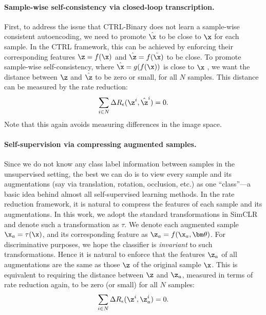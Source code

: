 \documentclass[../../book-main.tex]{subfiles}
\begin{document}
\paragraph{Sample-wise self-consistency via closed-loop transcription.} 
First, to address the issue that CTRL-Binary does not learn a sample-wise consistent autoencoding, we need to promote $\hat \x$ to be close to $\x$ for each sample. In the CTRL framework, this can be achieved by enforcing their corresponding features $\z=f(\x)$ and $\hat \z = f(\hat \x)$ to be close. 
To promote sample-wise self-consistency, where $\hat{\x} = g(f(\x))$ is close to $\x$ , we want the distance between $\z$ and $\hat{\z}$ to be zero or small, for all $N$ samples.
This distance can be measured by the rate reduction:
\begin{align}
\sum_{i\in N} \Delta R_\epsilon(\z^i,\hat{\z}^i) = 0.
\label{eqn:sample-self-consistency}\vspace{-2mm}
\end{align}
Note that this again avoids measuring differences in the image space.

\paragraph{Self-supervision via compressing augmented samples.} 
Since we do not know any class label information between samples in the unsupervised setting, the best we can do is to view every sample and its augmentations (say via translation, rotation, occlusion, etc.) as one ``class''—a basic idea behind almost all self-supervised learning methods. In the rate reduction framework, it is natural to compress the features of each sample and its augmentations. In this work, we adopt the standard transformations in SimCLR \cite{chen2020simple} and denote such a transformation as $\tau$. We denote each augmented sample $\x_a = \tau(\x)$, and its corresponding feature as $\z_a = f(\x_a, \bm \theta) $. For discriminative purposes, we hope the classifier is {\em invariant} to such transformations. Hence it is natural to enforce that the features $\z_a$ of all augmentations are the same as those $\z$ of the original sample $\x$. This is equivalent to requiring the distance between $\z$  and  $\z_a$, measured in terms of rate reduction again, to be zero (or small) for all $N$ samples: 
\begin{align}
\sum_{i\in N} \Delta R_\epsilon(\z^i,\z_{a}^i) = 0.
\label{eqn:sample-compression}\vspace{-3mm}
\end{align}
\end{document}
